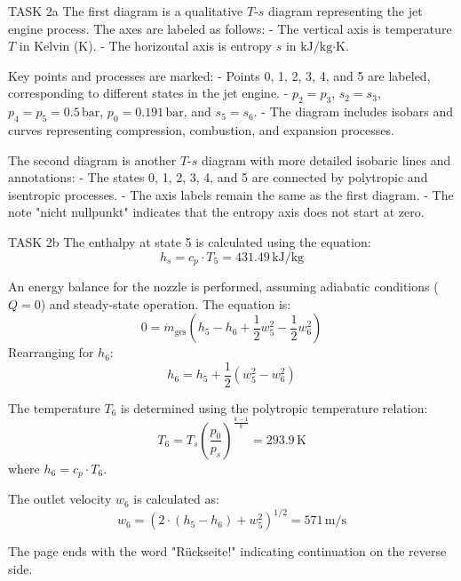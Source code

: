 TASK 2a  
The first diagram is a qualitative \( T \)-\( s \) diagram representing the jet engine process. The axes are labeled as follows:  
- The vertical axis is temperature \( T \) in Kelvin (K).  
- The horizontal axis is entropy \( s \) in \( \text{kJ}/\text{kg·K} \).  

Key points and processes are marked:  
- Points 0, 1, 2, 3, 4, and 5 are labeled, corresponding to different states in the jet engine.  
- \( p_2 = p_3 \), \( s_2 = s_3 \), \( p_4 = p_5 = 0.5 \, \text{bar} \), \( p_0 = 0.191 \, \text{bar} \), and \( s_5 = s_6 \).  
- The diagram includes isobars and curves representing compression, combustion, and expansion processes.  

The second diagram is another \( T \)-\( s \) diagram with more detailed isobaric lines and annotations:  
- The states 0, 1, 2, 3, 4, and 5 are connected by polytropic and isentropic processes.  
- The axis labels remain the same as the first diagram.  
- The note "nicht nullpunkt" indicates that the entropy axis does not start at zero.  

TASK 2b  
The enthalpy at state 5 is calculated using the equation:  
\[
h_s = c_p \cdot T_5 = 431.49 \, \text{kJ/kg}
\]  

An energy balance for the nozzle is performed, assuming adiabatic conditions (\( Q = 0 \)) and steady-state operation. The equation is:  
\[
0 = \dot{m}_{\text{ges}} \left( h_5 - h_6 + \frac{1}{2} w_5^2 - \frac{1}{2} w_6^2 \right)
\]  
Rearranging for \( h_6 \):  
\[
h_6 = h_5 + \frac{1}{2} \left( w_5^2 - w_6^2 \right)
\]  

The temperature \( T_6 \) is determined using the polytropic temperature relation:  
\[
T_6 = T_s \left( \frac{p_0}{p_s} \right)^{\frac{k-1}{k}} = 293.9 \, \text{K}
\]  
where \( h_6 = c_p \cdot T_6 \).  

The outlet velocity \( w_6 \) is calculated as:  
\[
w_6 = \left( 2 \cdot (h_5 - h_6) + w_5^2 \right)^{1/2} = 571 \, \text{m/s}
\]  

The page ends with the word "Rückseite!" indicating continuation on the reverse side.